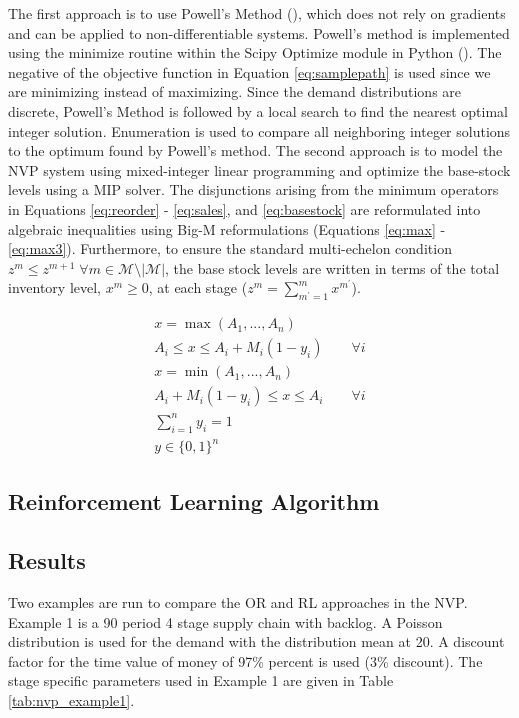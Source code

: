 \documentclass[12pt]{article}
\begin{document}
The first approach is to use Powell's Method (\cite{Powell1964AnDerivatives}), which does not rely on gradients and can be applied to non-differentiable systems. Powell's method is implemented using the minimize routine within the Scipy Optimize module in Python (\cite{Virtanen2020SciPyPython}). The negative of the objective function in Equation \ref{eq:samplepath} is used since we are minimizing instead of maximizing. Since the demand distributions are discrete, Powell's Method is followed by a local search to find the nearest optimal integer solution. Enumeration is used to compare all neighboring integer solutions to the optimum found by Powell's method. The second approach is to model the NVP system using mixed-integer linear programming and optimize the base-stock levels using a MIP solver. The disjunctions arising from the minimum operators in Equations \ref{eq:reorder} - \ref{eq:sales}, and \ref{eq:basestock} are reformulated into algebraic inequalities using Big-M reformulations (Equations \ref{eq:max} - \ref{eq:max3}). Furthermore, to ensure the standard multi-echelon condition $z^m \leq z^{m+1} \; \forall m \in \mathcal{M} \setminus |\mathcal{M}|$, the base stock levels are written in terms of the total inventory level, $x^m \geq 0$, at each stage ($z^m = \sum_{m^\prime = 1}^m x^{m^\prime}$).

\begin{align}
    x = \max(A_1,...,A_n) \qquad \qquad \label{eq:max}\\
    A_i \leq x \leq A_i + M_i(1-y_i) \qquad \forall i \label{eq:max1} \\
    x = \min(A_1,...,A_n) \qquad \qquad \label{eq:min} \\
    A_i + M_i(1-y_i) \leq x \leq A_i \qquad \forall i \label{eq:min1} \\
    \sum_{i=1}^n y_i = 1 \qquad \qquad \qquad \label{eq:max2} \\
    y \in \{0,1\}^n \qquad \qquad \qquad \label{eq:max3}
\end{align}

\subsection{Reinforcement Learning Algorithm}

\subsection{Results}

Two examples are run to compare the OR and RL approaches in the NVP. Example 1 is a 90 period 4 stage supply chain with backlog. A Poisson distribution is used for the demand with the distribution mean at 20. A discount factor for the time value of money of 97\% percent is used (3\% discount). The stage specific parameters used in Example 1 are given in Table \ref{tab:nvp_example1}.
\end{document}
